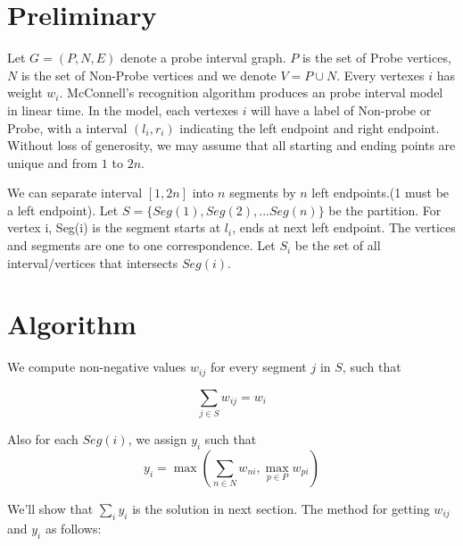 \documentclass[preprint,12pt,authoryear]{elsarticle}
\begin{document}
\section{Preliminary}
Let $G = (P, N, E)$ denote a probe interval graph. $P$ is the set of Probe vertices, $N$ is the set of Non-Probe vertices and we denote $V = P\cup N$. Every vertexes $i$ has weight $w_i$. McConnell's recognition algorithm produces an probe interval model in linear time. In the model, each vertexes $i$ will have a label of Non-probe or Probe, with a interval $(l_{i}, r_{i})$ indicating the left endpoint and right endpoint. Without loss of generosity, we may assume that all starting and ending points are unique and from $1$ to $2n$. \par
We can separate interval $[1,2n]$ into $n$ segments by $n$ left endpoints.(1 must be a left endpoint).
Let $S = \{Seg(1), Seg(2),...Seg(n)\}$ be the partition. For vertex i, Seg(i) is the segment starts at $l_{i}$, ends at next left endpoint. The vertices and segments are one to one correspondence. Let $S_{i}$ be the set of all interval/vertices that intersects $Seg(i)$.\par 

\section{Algorithm}

We compute non-negative values $w_{ij}$ for every segment $j$ in $S$, such that

\begin{equation}
\label{eqw}
\sum\limits_{j \in S} w_{ij} = w_{i}
\end{equation}

 Also for each $Seg(i)$, we assign $y_i$ such that%
\begin{equation}
\label{eqy}
y_i = \max(\sum\limits_{n\in N}w_{ni},\max\limits_{p\in P}w_{pi})
\end{equation}

We'll show that $\sum\limits_{i}y_{i}$ is the solution in next section. The method for getting $w_{ij}$ and $y_i$ as follows:
\end{document}
